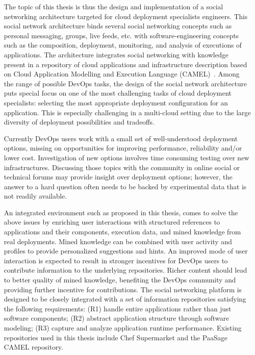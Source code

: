 The topic of this thesis is thus the design and implementation of a social networking architecture targeted for cloud deployment specialists engineers.
This social network architecture binds several social networking concepts such as personal messaging, groups, live feeds, etc. with software-engineering concepts such as the composition, deployment, monitoring, and analysis of executions of applications.  The architecture integrates social networking with knowledge present in a repository of cloud applications and infrastructure description based on Cloud Application Modelling and Execution Language (CAMEL)~\cite{paasagedeliverable212}. 
Among the range of possible DevOps tasks, the design of the social network architecture puts special focus on one of the most challenging tasks of cloud deployment specialists: selecting the most appropriate deployment configuration for an application. This is especially challenging in a multi-cloud setting due to the large diversity of deployment possibilities and tradeoffs. 

Currently DevOps users work with a small set of well-understood deployment options, missing on opportunities for improving performance, reliability and/or lower cost. Investigation of new options involves time consuming testing over new infrastructures. Discussing those topics with the community in online social or technical forums may provide insight over deployment options; however, the answer to a hard question often needs to be backed by experimental data that is not readily available. 

An integrated environment such as proposed in this thesis, comes to solve the above issues by enriching user interactions with structured references to applications and their components, execution data, and mined knowledge from real deployments. Mined knowledge can be combined with user activity and profiles to provide personalized suggestions and hints.  An improved mode of user interaction is expected to result in stronger incentives for DevOps users to contribute information to the underlying repositories. Richer content should lead to better quality of mined knowledge, benefiting the DevOps community and providing further incentive for contributions.  The social networking platform is designed to be closely integrated with a set of information repositories satisfying the following requirements: 
(R1) handle entire applications rather than just software components; (R2) abstract application structure through software modeling; (R3) capture and analyze application runtime performance.  Existing repositories used in this thesis include Chef Supermarket and the PaaSage CAMEL repository.

